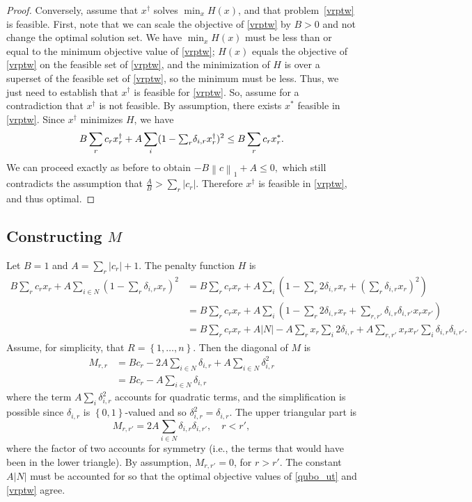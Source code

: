 \documentclass[11pt]{article}
\theoremstyle{definition}
\newcommand{\abs}[1]{\left| #1 \right|}
\newcommand{\norm}[1]{\left\| #1 \right\|}
\newcommand{\set}[1]{\left\{ #1 \right\}}
\newcommand{\card}[1]{\left| #1 \right|}
\newcommand{\smallsum}{{\textstyle{\sum}}}
\newcommand{\0}{\mathbf{0}}
\begin{document}
\begin{proof}
Conversely, assume that $x^{\dagger}$ solves $\min_x H(x)$, and that problem~\eqref{vrptw} is feasible.
First, note that we can scale the objective of \eqref{vrptw} by $B> 0$ and not change the optimal solution set.
We have $\min_x H(x)$ must be less than or equal to the minimum objective value of \eqref{vrptw};
$H(x)$ equals the objective of \eqref{vrptw} on the feasible set of \eqref{vrptw}, and the minimization of $H$ is over a superset of the feasible set of \eqref{vrptw}, so the minimum must be less.
Thus, we just need to establish that $x^{\dagger}$ is feasible for \eqref{vrptw}.
So, assume for a contradiction that $x^{\dagger}$ is not feasible.
By assumption, there exists $x^*$ feasible in \eqref{vrptw}.
Since $x^{\dagger}$ minimizes $H$, we have
\begin{equation}
\notag
B \sum_r c_r x_r^{\dagger} + A \sum_i (1 - \smallsum_r \delta_{i,r} x_r^{\dagger})^2 
\le
B \sum_r c_r x_r^*.
\end{equation}
We can proceed exactly as before to obtain
$
-B \norm{c}_1 + A \le 0,
$
which still contradicts the assumption that
$\frac{A}{B} > \sum_r \abs{c_r}$.
Therefore $x^{\dagger}$ is feasible in \eqref{vrptw}, and thus optimal.
\end{proof}

\subsection*{Constructing $M$}

Let $B = 1$ and $A = \smallsum_r \abs{c_r} + 1$.
The penalty function $H$ is 
\begin{align*}
	B\sum_r c_r x_r + 
	A \sum_{i \in N} (1 - \smallsum_r \delta_{i,r} x_r)^2 
&= 	B\sum_r c_r x_r + 
  	A \sum_i \left( 1 - \smallsum_r 2\delta_{i,r} x_r + (\smallsum_r \delta_{i,r} x_r)^2 \right) \\
&= 	B\sum_r c_r x_r + 
	A \sum_i \left( 1 - \smallsum_r 2\delta_{i,r} x_r + \smallsum_{r,r'} \delta_{i,r} \delta_{i,r'} x_r x_{r'} \right) \\
&=  B\sum_r c_r x_r + 
	A\card{N} - A\smallsum_r x_r \smallsum_i 2\delta_{i,r} + A\smallsum_{r,r'} x_r x_{r'} \smallsum_i \delta_{i,r} \delta_{i,r'}.
\end{align*}
Assume, for simplicity, that $R = \set{1,\dots, n}$.
Then the diagonal of $M$ is
\begin{align*}
	M_{r,r} 	&= Bc_r - 2A\smallsum_{i \in N} \delta_{i,r} + A\smallsum_{i \in N} \delta_{i,r}^2 \\
				&= Bc_r -  A\smallsum_{i \in N} \delta_{i,r}
\end{align*}
where the term $A\smallsum_i \delta_{i,r}^2$ accounts for quadratic terms, and the simplification is possible since $\delta_{i,r}$ is $\set{0,1}$-valued and so $\delta_{i,r}^2 = \delta_{i,r}$.
The upper triangular part is
\[
	M_{r,r'} = 2A\smallsum_{i \in N} \delta_{i,r} \delta_{i,r'}, \quad r < r',
\]
where the factor of two accounts for symmetry 
(i.e., the terms that would have been in the lower triangle).
By assumption, $M_{r,r'} = 0$, for $r > r'$.
The constant $A\card{N}$ must be accounted for so that the optimal objective values of \eqref{qubo_ut} and \eqref{vrptw} agree.
\end{document}
